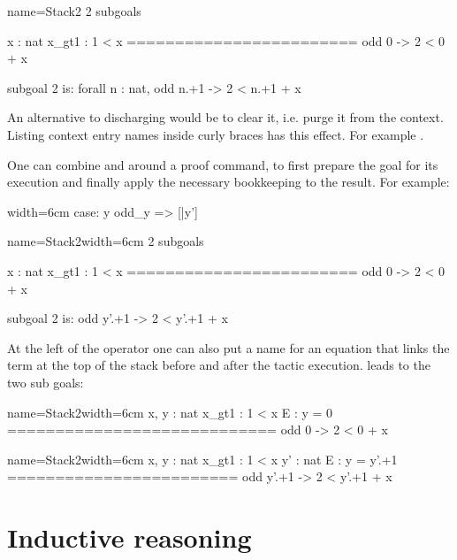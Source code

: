 \begin{coqout}{name=Stack2}{}
2 subgoals

  x : nat
  x_gt1 : 1 < x
  ========================
   odd 0 -> 2 < 0 + x

subgoal 2 is:
 forall n : nat, odd n.+1 -> 2 < n.+1 + x
\end{coqout}

An alternative to discharging  would be to clear it, i.e. purge it
from the context.  Listing context entry names inside curly braces has this
effect.  For example .

One can combine \C{:} and \C{=>} around a proof command, to first prepare the
goal for its execution and finally apply the necessary bookkeeping to the
result.  For example:

\begin{coq}{}{width=6cm}
case: y odd_y => [|y']
\end{coq}
\begin{coqout}{name=Stack2}{width=6cm}
2 subgoals

  x : nat
  x_gt1 : 1 < x
  ========================
   odd 0 -> 2 < 0 + x

subgoal 2 is:
 odd y'.+1 -> 2 < y'.+1 + x
\end{coqout}

At the left of the \C{:} operator one can also put a name for an
equation that links the term at the top of the stack before and
after the tactic execution.   leads to
the two sub goals:

\begin{coqout}{name=Stack2}{width=6cm}
 x, y : nat
 x_gt1 : 1 < x
 E : y = 0
============================
 odd 0 -> 2 < 0 + x
\end{coqout}
\begin{coqout}{name=Stack2}{width=6cm}
 x, y : nat
 x_gt1 : 1 < x
 y' : nat
 E : y = y'.+1
========================
 odd y'.+1 -> 2 < y'.+1 + x
\end{coqout}


\section{Inductive reasoning}\label{sec:indreason}

